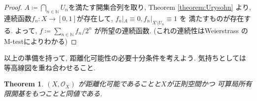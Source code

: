 \documentclass[lualatex]{ltjsbook}
\newtheorem{theorem}{Theorem}[chapter]
\theoremstyle{remark}
\theoremstyle{plain}
\begin{document}
\begin{proof}
  $A\coloneqq \bigcap_{n \in \mathbb{N}} U_n$を満たす開集合列を取り, Theorem \ref{theorem:Urysohn}
  より, 連続函数$f_n : X\to [0,1]$が存在して, $f_n |_A \equiv 0 , f_n |_{X \setminus U_n} \equiv 1$ を
  満たすものが存在する. よって, $f\coloneqq \sum_{n \in \mathbb{N}} f_n /2^n $ が所望の連続函数. 
  (これの連続性はWeierstrass のM-testによりわかる)
\end{proof}

以上の準備を持って, 距離化可能性の必要十分条件を考えよう. 
気持ちとしては等高線図を重ね合わせること. 

\begin{theorem}
  $\left( X , \mathcal{O}_{X} \right)$ が距離化可能であることと$X$が正則空間かつ
  可算局所有限開基をもつことと同値である. 
\end{theorem}
\end{document}
